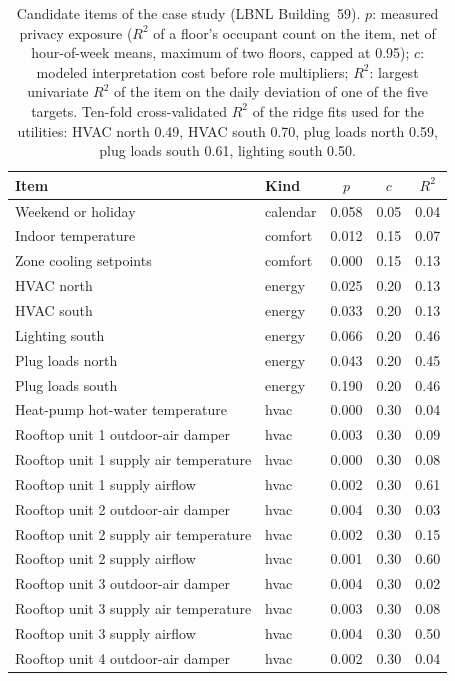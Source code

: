 \begin{table}[!htbp]
\centering
\caption{Candidate items of the case study (LBNL Building~59). $p$: measured privacy exposure ($R^2$ of a floor's occupant count on the item, net of hour-of-week means, maximum of two floors, capped at 0.95); $c$: modeled interpretation cost before role multipliers; $R^2$: largest univariate $R^2$ of the item on the daily deviation of one of the five targets. Ten-fold cross-validated $R^2$ of the ridge fits used for the utilities: HVAC north 0.49, HVAC south 0.70, plug loads north 0.59, plug loads south 0.61, lighting south 0.50.}
\label{tab:S-case-items}
\footnotesize
\begin{tabular}{@{}l l ccc@{}}
\toprule
Item & Kind & $p$ & $c$ & $R^2$ \\
\midrule
Weekend or holiday & calendar & 0.058 & 0.05 & 0.04 \\
Indoor temperature & comfort & 0.012 & 0.15 & 0.07 \\
Zone cooling setpoints & comfort & 0.000 & 0.15 & 0.13 \\
HVAC north & energy & 0.025 & 0.20 & 0.13 \\
HVAC south & energy & 0.033 & 0.20 & 0.13 \\
Lighting south & energy & 0.066 & 0.20 & 0.46 \\
Plug loads north & energy & 0.043 & 0.20 & 0.45 \\
Plug loads south & energy & 0.190 & 0.20 & 0.46 \\
Heat-pump hot-water temperature & hvac & 0.000 & 0.30 & 0.04 \\
Rooftop unit 1 outdoor-air damper & hvac & 0.003 & 0.30 & 0.09 \\
Rooftop unit 1 supply air temperature & hvac & 0.000 & 0.30 & 0.08 \\
Rooftop unit 1 supply airflow & hvac & 0.002 & 0.30 & 0.61 \\
Rooftop unit 2 outdoor-air damper & hvac & 0.004 & 0.30 & 0.03 \\
Rooftop unit 2 supply air temperature & hvac & 0.002 & 0.30 & 0.15 \\
Rooftop unit 2 supply airflow & hvac & 0.001 & 0.30 & 0.60 \\
Rooftop unit 3 outdoor-air damper & hvac & 0.004 & 0.30 & 0.02 \\
Rooftop unit 3 supply air temperature & hvac & 0.003 & 0.30 & 0.08 \\
Rooftop unit 3 supply airflow & hvac & 0.004 & 0.30 & 0.50 \\
Rooftop unit 4 outdoor-air damper & hvac & 0.002 & 0.30 & 0.04 \\

\end{tabular}
\end{table}
